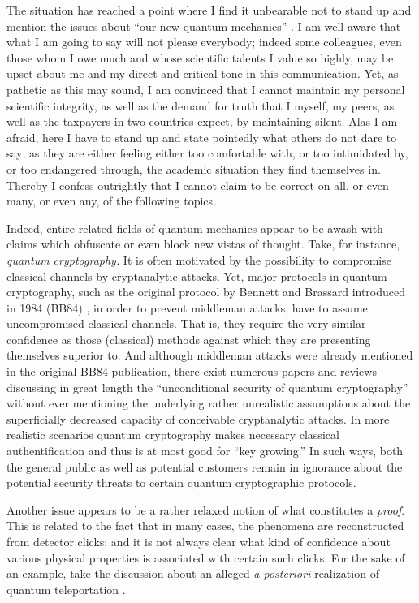 \documentclass[%
 preprint,
 showpacs,
 showkeys,
 preprintnumbers,
 amsmath,amssymb,
 aps,
  pra,
  longbibliography,
 ]{revtex4-1}
\begin{document}
The situation has reached a point where I find it unbearable not to stand up and mention the issues about ``our new quantum mechanics'' \cite[p.~866]{born-26-1}.
I am well aware that what I am going to say will not please everybody; indeed some colleagues, even those whom I owe much and whose scientific talents I value so highly,
may be upset about me and my direct and critical tone in this communication.
Yet, as pathetic as this may sound,  I am convinced that I cannot maintain my personal scientific integrity,
as well as the demand for truth that I myself, my peers, as well as the taxpayers in two countries expect,
by maintaining silent.
Alas I am afraid, here I have to stand up and state pointedly what others do not dare to say; as they are
either feeling either too comfortable with, or too intimidated by, or too endangered through,
the academic situation they find themselves in.
Thereby I confess outrightly that I cannot claim to be correct on all, or even many, or even any, of the following topics.



Indeed, entire related fields of quantum mechanics appear to be awash with claims which obfuscate or even block new vistas of thought.
Take, for instance, {\em quantum cryptography.}
It is often motivated by the possibility to compromise classical channels by cryptanalytic attacks.
Yet, major protocols in quantum cryptography,
such as the original protocol by Bennett and  Brassard introduced in 1984 (BB84) \cite{benn-84,benn-92}, in order to prevent
middleman attacks, have to assume uncompromised classical channels.
That is, they require the very similar confidence as those (classical) methods
against which they are presenting themselves superior to.
And although middleman attacks were already mentioned in the original BB84 publication,
there exist numerous papers and reviews \cite{gisin-qc-rmp}
discussing in great length the ``unconditional security of quantum cryptography'' without ever mentioning
the underlying rather unrealistic assumptions about the superficially decreased capacity of conceivable cryptanalytic attacks.
In more realistic scenarios \cite{ell-co-05} quantum cryptography makes necessary classical authentification
and thus is at most good for  ``key growing.''
In such ways, both the general public as well as potential customers remain in ignorance about the potential security threats to
certain quantum cryptographic protocols.


Another issue appears to be a rather relaxed notion of what constitutes a {\em proof}.
This is related to the fact that in many cases, the phenomena are reconstructed from detector clicks;
and it is not always clear what kind of confidence about various physical properties is associated with certain such clicks.
For the sake of an example, take the discussion \cite{Kimble-aposterioriQT,Bouwm-aposterioriQTReply} about an alleged {\it a posteriori} realization of
quantum teleportation \cite{BBCJPW}.
\end{document}
